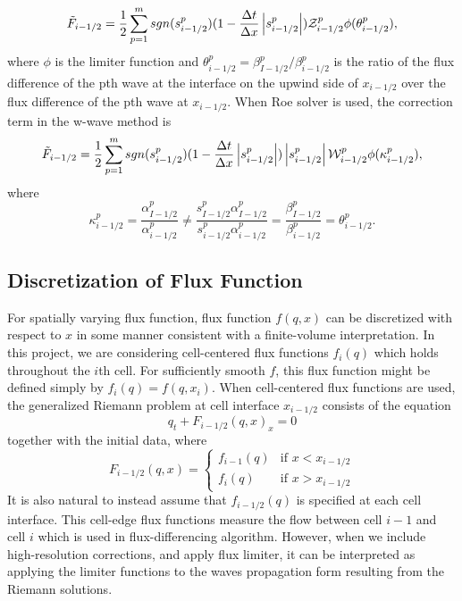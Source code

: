 \documentclass{article}
\providecommand{\abs}[1]{\left|#1\right|}
\begin{document}
\begin{align}
\tilde{F}_{i-1/2}=\frac{1}{2}\sum_{p=1}^{m} sgn(s_{i-1/2}^{p})(1-\frac{\Delta t}{\Delta x}\abs{s^p_{i-1/2}}){\cal Z}^p_{i-1/2} \phi(\theta^p_{i-1/2}),
\end{align}
where $\phi$ is the limiter function and $\theta^p_{i-1/2}=\beta^p_{I-1/2}/\beta^p_{i-1/2}$ is the ratio of the flux difference of the pth wave at the interface on the upwind side of $x_{i-1/2}$ over the flux difference of the pth wave at $x_{i-1/2}$. When Roe solver is used, the correction term in the w-wave method is
\begin{align}
\tilde{F}_{i-1/2}=\frac{1}{2}\sum_{p=1}^{m} sgn(s_{i-1/2}^{p})(1-\frac{\Delta t}{\Delta x}\abs{s^p_{i-1/2}})\abs{s_{i-1/2}^p}{\cal W}^p_{i-1/2} \phi(\kappa^p_{i-1/2}),
\end{align}
where
\[
\kappa^p_{i-1/2}=\frac{\alpha^p_{I-1/2}}{\alpha^p_{i-1/2}}
\neq
\frac{s^p_{I-1/2}\alpha^p_{I-1/2}}{s^p_{i-1/2}\alpha^p_{i-1/2}}
=\frac{\beta^p_{I-1/2}}{\beta^p_{i-1/2}}=\theta^p_{i-1/2}.
\]

\subsection{Discretization of Flux Function}
	For spatially varying flux function, flux function $f(q,x)$ can be discretized with respect to $x$ in some manner consistent with a finite-volume interpretation. In this project, we are considering cell-centered flux functions $f_i(q)$ which holds throughout the $i$th cell. For sufficiently smooth $f$, this flux function might be defined simply by $f_i(q)=f(q,x_i)$. When cell-centered flux functions are used, the generalized Riemann problem at cell interface $x_{i-1/2}$ consists of the equation
	\[
	q_t + F_{i-1/2}(q,x)_x=0
	\]
	together with the initial data, where
	\[
	F_{i-1/2}(q,x)=\begin{cases}f_{i-1}(q) & \text{if } x<x_{i-1/2}\\
	f_i(q) & \text{if } x>x_{i-1/2}\end{cases}
	\]
	It is also natural to instead assume that $f_{i-1/2}(q)$ is specified at each cell interface. This cell-edge flux functions measure the flow between cell $i-1$ and cell $i$ which is used in flux-differencing algorithm. However, when we include high-resolution corrections, and apply flux limiter, it can be interpreted as applying the limiter functions to the waves propagation form resulting from the Riemann solutions.\\
	
\end{document}
